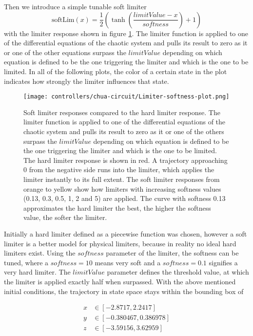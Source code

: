 \documentclass[main]{subfiles}
\begin{document}
Then we introduce a simple tunable soft limiter \[\text{softLim}(x) = \frac{1}{2} \left(\tanh\left(\frac{limitValue - x}{softness}\right) + 1\right)\] with the limiter response shown in figure \ref{figure:softlimiterresponse}. %
%
The limiter function is applied to one of the differential equations of the chaotic system and pulls its result to zero as it or one of the other equations surpass the $limitValue$ depending on which equation is defined to be the one triggering the limiter and which is the one to be limited.
%
In all of the following plots, the color of a certain state in the plot indicates how strongly the limiter influences that state.

\begin{figure}[H]
\centering
\texttt{[image: controllers/chua-circuit/Limiter-softness-plot.png]}
\caption[Soft limiter responses]{Soft limiter responses compared to the hard limiter response. The limiter function is applied to one of the differential equations of the chaotic system and pulls its result to zero as it or one of the others surpass the $limitValue$ depending on which equation is defined to be the one triggering the limiter and which is the one to be limited. The hard limiter response is shown in red. A trajectory approaching 0 from the negative side runs into the limiter, which applies the limiter instantly to its full extent. The soft limiter responses from orange to yellow show how limiters with increasing softness values (0.13, 0.3, 0.5, 1, 2 and 5) are applied. The curve with softness 0.13 approximates the hard limiter the best, the higher the softness value, the softer the limiter.}
\label{figure:softlimiterresponse}
\end{figure}

Initially a hard limiter defined as a piecewise function was chosen, however a soft limiter is a better model for physical limiters, because in reality no ideal hard limiters exist. %
%
Using the $softness$ parameter of the limiter, the softness can be tuned, where a \(softness = 10\) means very soft and a \(softness = 0.1\) signifies a very hard limiter. %
%
The $limitValue$ parameter defines the threshold value, at which the limiter is applied exactly half when surpassed. %
%
With the above mentioned initial conditions, the trajectory in state space stays within the bounding box of 

\begin{align*}
x &\in [-2.8717,2.2417]\\
y &\in [-0.380467,0.386978]\\
z &\in [-3.59156,3.62959]
\end{align*}
\end{document}
